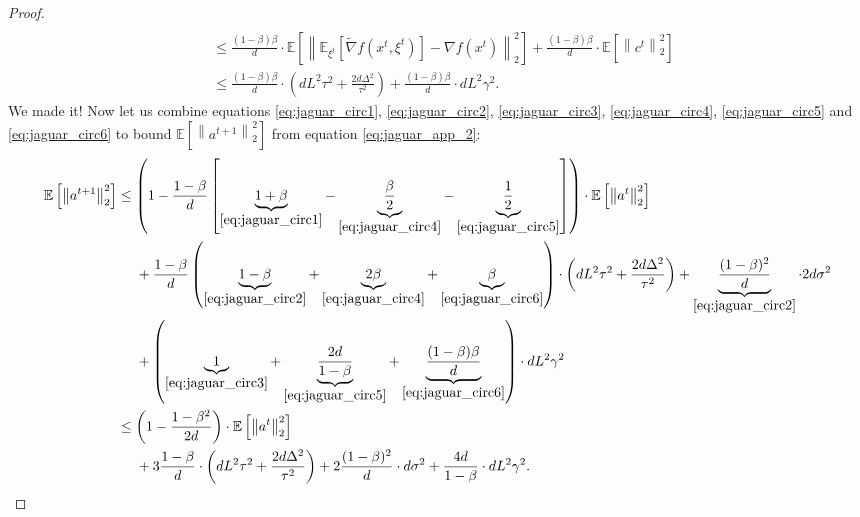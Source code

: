 \documentclass{article}
\theoremstyle{plain}
\theoremstyle{definition}
\theoremstyle{remark}
\newcommand{\expect}[1]{\mathbb{E}\left[ #1 \right]}
\newcommand{\norm}[1]{\left\| #1 \right\|}
\newcommand{\EEb}[2]{\mathbb{E}_{#1}\left[ #2 \right]}
\begin{document}
\begin{proof}
\begin{align}
{{            }}
            \nonumber
            \\&\leq
            \frac{(1 - \beta) \beta}{d} \cdot 
            \expect{\norm{\EEb{\xi^t}{\widetilde{\nabla} f(x^t, \xi^t)} - \nabla f(x^t)}_2^2}
            +
            \frac{(1 - \beta) \beta}{d} \cdot \expect{\norm{c^t}_2^2}
            \nonumber
            \\&\leq
            \frac{(1 - \beta) \beta}{d} \cdot \left( 
                d L^2 \tau^2 
                + \frac{2 d \Delta^2}{\tau^2} 
            \right)
            +
            \frac{(1 - \beta) \beta}{d} \cdot dL^2\gamma^2 .
            \label{eq:jaguar_circ6}
        \end{align}
        We made it! Now let us combine equations \eqref{eq:jaguar_circ1}, \eqref{eq:jaguar_circ2}, \eqref{eq:jaguar_circ3}, \eqref{eq:jaguar_circ4}, \eqref{eq:jaguar_circ5} and \eqref{eq:jaguar_circ6} to bound $\expect{\norm{a^{t+1}}_2^2}$ from equation \eqref{eq:jaguar_app_2}:
        \begin{align*}
            \expect{\norm{a^{t+1}}_2^2}
            &\leq
            \left( 1 - \frac{1 - \beta}{d} \left[ \underbrace{1 + \beta}_{\eqref{eq:jaguar_circ1}} - \underbrace{\frac{\beta}{2}}_{\eqref{eq:jaguar_circ4}} - \underbrace{\frac{1}{2}}_{\eqref{eq:jaguar_circ5}} \right] \right) \cdot \expect{\norm{a^t}_2^2}
            \\&~~~~+
            \frac{1-\beta}{d} \left( \underbrace{1 - \beta}_{\eqref{eq:jaguar_circ2}} + \underbrace{2\beta}_{\eqref{eq:jaguar_circ4}} + \underbrace{\beta}_{\eqref{eq:jaguar_circ6}} \right) \cdot \left( 
                d L^2 \tau^2 
                + \frac{2 d \Delta^2}{\tau^2} 
            \right)
            +
            \underbrace{\frac{(1-\beta)^2}{d}}_{\eqref{eq:jaguar_circ2}} \cdot 2 d \sigma^2
            \\&~~~~+
            \left(\underbrace{1}_{\eqref{eq:jaguar_circ3}} + \underbrace{\frac{2d}{1-\beta}}_{\eqref{eq:jaguar_circ5}} + \underbrace{\frac{(1-\beta)\beta}{d}}_{\eqref{eq:jaguar_circ6}} \right) \cdot dL^2 \gamma^2
            \\&\leq
            \left(1 - \frac{1 - \beta^2}{2d} \right) \cdot \expect{\norm{a^t}_2^2}
            \\&~~~~+
            3 \frac{1 - \beta}{d} \cdot \left( 
                d L^2 \tau^2 
                + \frac{2 d \Delta^2}{\tau^2} 
            \right)
            +
            2 \frac{(1-\beta)^2}{d} \cdot  d \sigma^2
            +
            \frac{4 d}{1 - \beta} \cdot d L^2 \gamma^2 .

\end{align*}
\end{proof}
\end{document}
